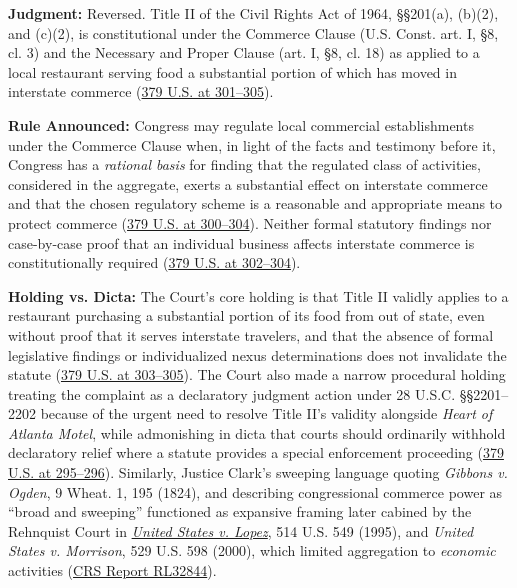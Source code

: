\documentclass[12pt]{article}
\begin{document}
\textbf{Judgment:} Reversed. Title II of the Civil Rights Act of 1964, \S\S 201(a), (b)(2), and (c)(2), is constitutional under the Commerce Clause (U.S. Const. art. I, \S 8, cl. 3) and the Necessary and Proper Clause (art. I, \S 8, cl. 18) as applied to a local restaurant serving food a substantial portion of which has moved in interstate commerce (\href{https://supreme.justia.com/cases/federal/us/379/294/}{379 U.S. at 301--305}).

\textbf{Rule Announced:} Congress may regulate local commercial establishments under the Commerce Clause when, in light of the facts and testimony before it, Congress has a \textit{rational basis} for finding that the regulated class of activities, considered in the aggregate, exerts a substantial effect on interstate commerce and that the chosen regulatory scheme is a reasonable and appropriate means to protect commerce (\href{https://supreme.justia.com/cases/federal/us/379/294/}{379 U.S. at 300--304}). Neither formal statutory findings nor case-by-case proof that an individual business affects interstate commerce is constitutionally required (\href{https://supreme.justia.com/cases/federal/us/379/294/}{379 U.S. at 302--304}).

\textbf{Holding vs. Dicta:} The Court's core holding is that Title II validly applies to a restaurant purchasing a substantial portion of its food from out of state, even without proof that it serves interstate travelers, and that the absence of formal legislative findings or individualized nexus determinations does not invalidate the statute (\href{https://supreme.justia.com/cases/federal/us/379/294/}{379 U.S. at 303--305}). The Court also made a narrow procedural holding treating the complaint as a declaratory judgment action under 28 U.S.C. \S\S 2201--2202 because of the urgent need to resolve Title II's validity alongside \textit{Heart of Atlanta Motel}, while admonishing in dicta that courts should ordinarily withhold declaratory relief where a statute provides a special enforcement proceeding (\href{https://supreme.justia.com/cases/federal/us/379/294/}{379 U.S. at 295--296}). Similarly, Justice Clark's sweeping language quoting \textit{Gibbons v. Ogden}, 9 Wheat. 1, 195 (1824), and describing congressional commerce power as ``broad and sweeping'' functioned as expansive framing later cabined by the Rehnquist Court in \href{https://supreme.justia.com/cases/federal/us/514/549/}{\textit{United States v. Lopez}}, 514 U.S. 549 (1995), and \textit{United States v. Morrison}, 529 U.S. 598 (2000), which limited aggregation to \textit{economic} activities (\href{https://www.everycrsreport.com/reports/RL32844.html}{CRS Report RL32844}).
\end{document}
